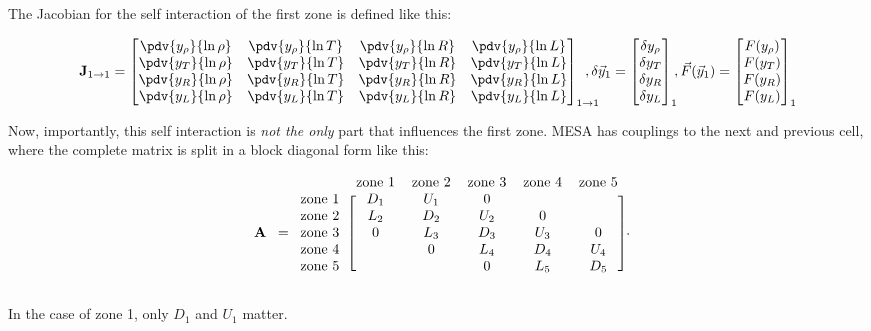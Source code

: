 \documentclass[a4paper,10pt]{article}
\begin{document}
The Jacobian for the self interaction of the first zone is defined like this:

\begin{equation*}
    \mathbf{J}_{1 \to 1}  = \begin{bmatrix}
        \pdv{y_{\rho} }{\ln \rho } & \pdv{y_{\rho} }{\ln T }& \pdv{y_{\rho} }{\ln R } & \pdv{y_{\rho} }{\ln L }\\
        \pdv{y_{T} }{\ln \rho } & \pdv{y_{T} }{\ln T }& \pdv{y_{T} }{\ln R } & \pdv{y_{T} }{\ln L }\\
        \pdv{y_{R} }{\ln \rho } & \pdv{y_{R} }{\ln T }& \pdv{y_{R} }{\ln R } & \pdv{y_{R} }{\ln L }\\
        \pdv{y_{L} }{\ln \rho } & \pdv{y_{L} }{\ln T }& \pdv{y_{L} }{\ln R } & \pdv{y_{L} }{\ln L }
        \end{bmatrix}_{1\to 1}\hspace{-12pt}, \delta \vec{y}_{1}  = \begin{bmatrix}
    \delta y_{\rho }\\ 
    \delta y_{T }\\ 
    \delta y_{R }\\ 
    \delta y_{L } 
    \end{bmatrix}_{1}\hspace{-4pt}, \vec{F}(\vec{y}_{1}) = \begin{bmatrix}
    F(y_{\rho })\\ 
    F(y_{T })\\ 
    F(y_{R })\\ 
    F(y_{L }) 
    \end{bmatrix}_{1}
\end{equation*}

Now, importantly, this self interaction is \emph{not the only} part that influences the first zone. MESA has couplings to the next and previous cell, where the complete matrix is split in a block diagonal form like this:

\begin{equation*}
    \begin{blockarray}{cccccc}
        & \text{zone 1}  & \text{zone 2} & \text{zone 3} & \text{zone 4}& \text{zone 5} \\
        \begin{block}{r[ccccc]}
          \phantom{\mathbf{A} = }\;\text{zone 1} & D_{1}  & U_{1}  & 0& &  \\
        \phantom{\mathbf{A} = }\;\text{zone 2} & L_{2}  & D_{2}  & U_{2}& 0&   \\
        \mathbf{A}\;\; =\;\; \text{zone 3} & 0 & L_{3}  & D_{3} & U_{3}  & 0 \\
        \phantom{\mathbf{A} = }\;\text{zone 4} &   & 0  & L_{4} & D_{4} & U_{4}  \\
        \phantom{\mathbf{A} = }\;\text{zone 5} &   &   & 0 & L_{5} & D_{5}  \\
      \end{block}
    \end{blockarray}.
\end{equation*}

In the case of zone 1, only \(D_{1} \) and \(U_{1} \) matter.
\end{document}
